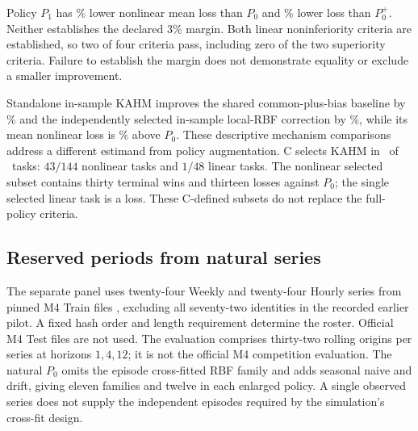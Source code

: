 \begin{table}[t]
\centering\small
\caption{All four prespecified policy-augmentation criteria. Nonlinear
comparisons require a 3\% improvement and linear comparisons allow 5\%
excess loss. The adjusted upper endpoint is on the margin-adjusted loss
difference in Equation~\eqref{eq:supp-pa-inference}, not on the percentage
gain.}
\label{supp:pa-primary}

\end{table}

Policy $P_1$ has \PAGainPZero\% lower nonlinear mean loss than $P_0$
and \PAGainExtra\% lower loss than $P_0^+$. Neither establishes the
declared 3\% margin. Both linear noninferiority criteria are established,
so two of four criteria pass, including zero of the two superiority
criteria. Failure to establish the margin does not demonstrate equality
or exclude a smaller improvement.

Standalone in-sample KAHM improves the shared common-plus-bias baseline
by \PAMechanismBiasGain\% and the independently selected in-sample
local-RBF correction by \PAMechanismRBFGain\%, while its mean nonlinear
loss is \PAStandalonePolicyPenalty\% above $P_0$. These descriptive
mechanism comparisons address a different estimand from policy
augmentation. C selects KAHM in \PASyntheticSelections\ of
\PATasks\ tasks: $43/144$ nonlinear tasks and $1/48$ linear tasks.
The nonlinear selected subset contains thirty terminal wins and thirteen
losses against $P_0$; the single selected linear task is a loss.
These C-defined subsets do not replace the full-policy criteria.

\subsection{Reserved periods from natural series}

The separate panel uses twenty-four Weekly and twenty-four Hourly series
from pinned M4 Train files \citep{M4DataSnapshot2026}, excluding all
seventy-two identities in the recorded earlier pilot. A fixed hash order
and length requirement determine the roster. Official M4 Test files are
not used. The evaluation comprises thirty-two rolling origins per series
at horizons $1,4,12$; it is not the official M4 competition evaluation.
The natural $P_0$ omits the episode cross-fitted RBF family and adds
seasonal naive and drift, giving eleven families and twelve in each
enlarged policy. A single observed series does not supply the independent
episodes required by the simulation's cross-fit design.

